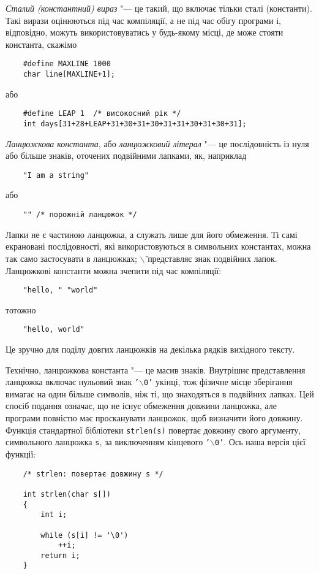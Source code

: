 \documentclass[a4paper,12pt]{book}
\begin{document}
  \textit{Сталий (константний) вираз} "--- це такий, що включає тільки сталі (константи).
  Такі вирази оцінюються під час компіляції, а не під час обігу програми і, відповідно,
  можуть використовуватись у будь-якому місці, де може стояти константа, скажімо
  \begin{verbatim}
    #define MAXLINE 1000
    char line[MAXLINE+1];
  \end{verbatim}
  або
  \begin{verbatim}
    #define LEAP 1  /* високосний рік */
    int days[31+28+LEAP+31+30+31+30+31+31+30+31+30+31];
  \end{verbatim}

  \textit{Ланцюжкова константа}, або \textit{ланцюжковий літерал} "--- це послідовність із
  нуля або більше знаків, оточених подвійними лапками, як, наприклад
  \begin{verbatim}
    "I am a string"
  \end{verbatim}
  або
  \begin{verbatim}
    "" /* порожній ланцюжок */
  \end{verbatim}

  Лапки не є частиною ланцюжка, а служать лише для його обмеження. Ті самі
  екрановані послідовності, які використовуються в символьних константах, можна так само
  застосувати в ланцюжках; \texttt{\mbox{$\backslash$}\"{}} представляє знак подвійних лапок. Ланцюжкові
  константи можна зчепити під час компіляції:
  \begin{verbatim}
    "hello, " "world"
  \end{verbatim}
  тотожно
  \begin{verbatim}
    "hello, world"
  \end{verbatim}

  Це зручно для поділу довгих ланцюжків на декілька рядків вихідного тексту.

  Технічно, ланцюжкова константа "--- це масив знаків. Внутрішнє представлення ланцюжка
  включає нульовий знак \texttt{'\mbox{$\backslash$}0'} укінці, тож фізичне місце зберігання вимагає на один
  більше символів, ніж ті, що знаходяться в подвійних лапках. Цей спосіб подання означає,
  що не існує обмеження довжини ланцюжка, але програми повністю має просканувати ланцюжок,
  щоб визначити його довжину. Функція стандартної бібліотеки \texttt{strlen(s)} повертає
  довжину свого аргументу, символьного ланцюжка \texttt{s}, за виключенням кінцевого
  \texttt{'\mbox{$\backslash$}0'}. Ось наша версія цієї функції:
  \begin{verbatim}
    /* strlen: повертає довжину s */

    int strlen(char s[])
    {
        int i;

        while (s[i] != '\0')
            ++i;
        return i;
    }
  \end{verbatim}
\end{document}
